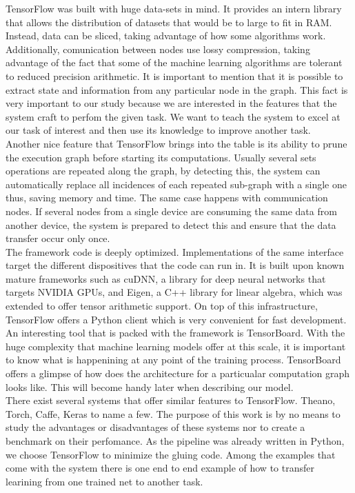 TensorFlow was built with huge data-sets in mind. It provides an intern library that allows the distribution of datasets that would be to large to fit in RAM. Instead, data can be sliced, taking advantage of how some algorithms work. Additionally, comunication between nodes use lossy compression, taking advantage of the fact that some of the machine learning algorithms are tolerant to reduced precision arithmetic. It is important to mention that it is possible to extract state and information from any particular node in the graph. This fact is very important to our study because we are interested in the features that the system craft to perfom the given task. We want to teach the system to excel at our task of interest and then use its knowledge to improve another task.\\

Another nice feature that TensorFlow brings into the table is its ability to prune the execution graph before starting its computations. Usually several sets operations are repeated along the graph, by detecting this, the system can automatically replace all incidences of each repeated sub-graph with a single one thus, saving memory and time. The same case happens with communication nodes. If several nodes from a single device are consuming the same data from another device, the system is prepared to detect this and ensure that the data transfer occur only once.\\

The framework code is deeply optimized. Implementations of the same interface target the different dispositives that the code can run in. It is built upon known mature frameworks such as cuDNN, a library for deep neural networks that targets NVIDIA GPUs, and Eigen, a C++ library for linear algebra, which was extended to offer tensor arithmetic support. On top of this infrastructure, TensorFlow offers a Python client which is very convenient for fast development.\\

An interesting tool that is packed with the framework is TensorBoard. With the huge complexity that machine learning models offer at this scale, it is important to know what is happenining at any point of the training process. TensorBoard offers a glimpse of how does the architecture for a particualar computation graph looks like. This will become handy later when describing our model.\\

There exist several systems that offer similar features to TensorFlow. Theano, Torch, Caffe, Keras to name a few. The purpose of this work is by no means to study the advantages or disadvantages of these systems nor to create a benchmark on their perfomance. As the pipeline was already written in Python, we choose TensorFlow to minimize the gluing code. Among the examples that come with the system there is one end to end example of how to transfer learining from one trained net to another task.\\











